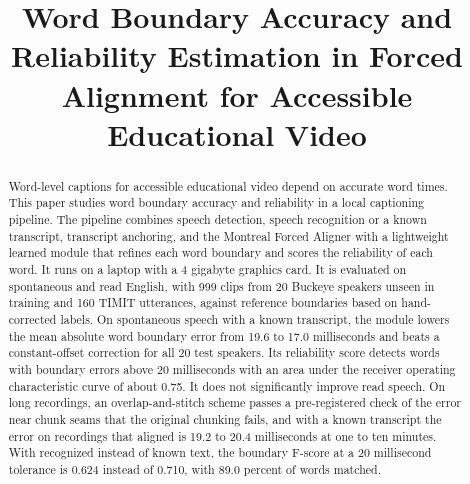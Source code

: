 \documentclass[conference,a4paper]{IEEEtran}
\begin{document}
\title{Word Boundary Accuracy and Reliability Estimation in Forced Alignment for Accessible Educational Video}

\author{
\and
{}
}

\maketitle

\begin{abstract}
Word-level captions for accessible educational video depend on accurate word times. This paper studies word boundary accuracy and reliability in a local captioning pipeline. The pipeline combines speech detection, speech recognition or a known transcript, transcript anchoring, and the Montreal Forced Aligner with a lightweight learned module that refines each word boundary and scores the reliability of each word. It runs on a laptop with a 4 gigabyte graphics card. It is evaluated on spontaneous and read English, with 999 clips from 20 Buckeye speakers unseen in training and 160 TIMIT utterances, against reference boundaries based on hand-corrected labels. On spontaneous speech with a known transcript, the module lowers the mean absolute word boundary error from 19.6 to 17.0 milliseconds and beats a constant-offset correction for all 20 test speakers. Its reliability score detects words with boundary errors above 20 milliseconds with an area under the receiver operating characteristic curve of about 0.75. It does not significantly improve read speech. On long recordings, an overlap-and-stitch scheme passes a pre-registered check of the error near chunk seams that the original chunking fails, and with a known transcript the error on recordings that aligned is 19.2 to 20.4 milliseconds at one to ten minutes. With recognized instead of known text, the boundary F-score at a 20 millisecond tolerance is 0.624 instead of 0.710, with 89.0 percent of words matched.
\end{abstract}
\end{document}
